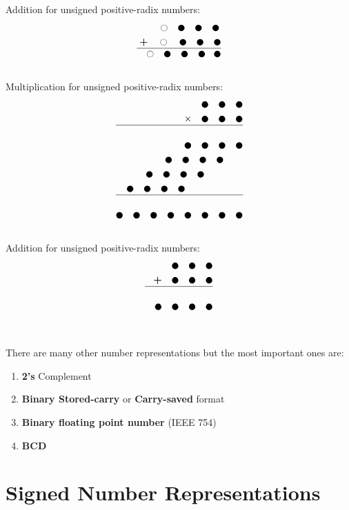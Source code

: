 Addition for unsigned positive-radix numbers:
\begin{align*}
	\ocircle\quad\newmoon\quad\newmoon\quad\newmoon \,\\
	\textbf{+}\quad\ocircle\quad\newmoon\quad\newmoon\quad\newmoon\\
	\hline
	\quad\ocircle\quad\newmoon\quad\newmoon\quad\newmoon\,\,\,\,\,\newmoon
\end{align*}\\
Multiplication for unsigned positive-radix numbers:
\begin{align*}
	\newmoon\quad\newmoon\quad\newmoon \\
	\mathcal{\times}\quad\newmoon\quad\newmoon\quad\newmoon\\
	\hline\\
	\newmoon\quad\newmoon\quad\newmoon\quad\newmoon\\
	\newmoon\quad\newmoon\quad\newmoon\quad\newmoon\quad\quad\\
	\newmoon\quad\newmoon\quad\newmoon\quad\newmoon\qquad\qquad\\
	\newmoon\quad\newmoon\quad\newmoon\quad\newmoon\qquad\qquad\qquad\\
	\hline\\
	\newmoon\quad\newmoon\quad\newmoon\quad\newmoon\quad\newmoon\quad\newmoon\quad\newmoon\quad\newmoon
\end{align*}\\
Addition for unsigned positive-radix numbers:
\begin{align*}
	\newmoon\quad\newmoon\quad\newmoon \\
	\textbf{+}\quad\newmoon\quad\newmoon\quad\newmoon\\
	\hline\\
	\quad\newmoon\quad\newmoon\quad\newmoon\quad\newmoon
\end{align*}\\
\\
There are many other number representations but the most important ones are:
\begin{enumerate}
	\item \textbf{2's} Complement
	\item \textbf{Binary Stored-carry} or \textbf{Carry-saved} format
	\item \textbf{Binary floating point number } (IEEE 754)
	\item \textbf{BCD}
\end{enumerate}

\section{Signed Number Representations}
